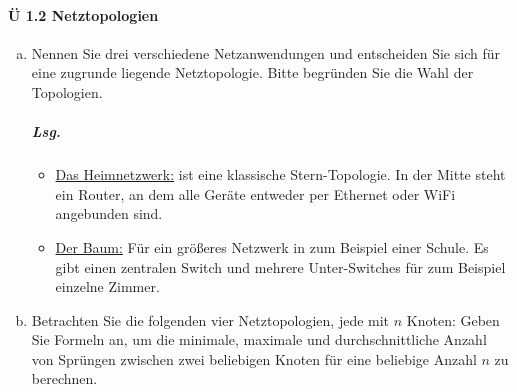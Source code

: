 \documentclass{scrreprt}
\begin{document}
\paragraph{Ü 1.2 Netztopologien}
\begin{enumerate}[(a)]
\item Nennen Sie drei verschiedene Netzanwendungen und entscheiden Sie sich
  für eine zugrunde liegende Netztopologie.
  Bitte begründen Sie die Wahl der Topologien.

  \subparagraph{Lsg.}
  \begin{itemize}
  \item \underline{Das Heimnetzwerk:} ist eine klassische Stern-Topologie.
    In der Mitte steht ein Router, an dem alle Geräte entweder per Ethernet oder
    WiFi angebunden sind.

  \item \underline{Der Baum:} Für ein größeres Netzwerk in zum Beispiel einer
    Schule.
    Es gibt einen zentralen Switch und mehrere Unter-Switches für zum Beispiel
    einzelne Zimmer.
  \end{itemize}

\newpage
\item Betrachten Sie die folgenden vier Netztopologien, jede mit $n$ Knoten:
  Geben Sie Formeln an, um die minimale, maximale und durchschnittliche Anzahl
  von Sprüngen zwischen zwei beliebigen Knoten für eine beliebige Anzahl $n$
  zu berechnen.

  \begin{minipage}{0.2\textwidth}
  \end{minipage}
  \begin{minipage}{0.2\textwidth}
\end{minipage}
\end{enumerate}
\end{document}
